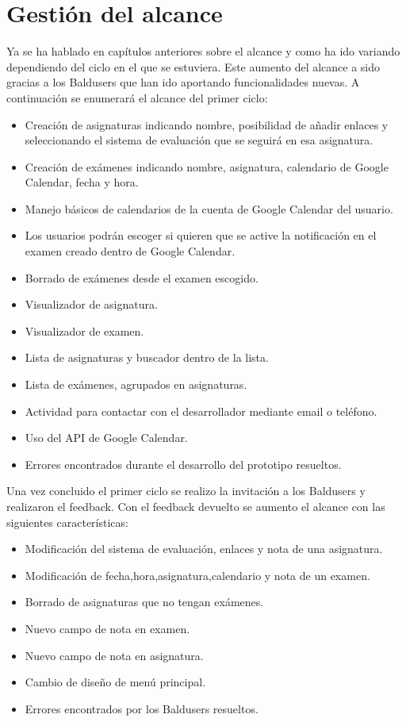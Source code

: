 \section{Gestión del alcance}
\label{secc:Gestión del alcance}

Ya se ha hablado en capítulos anteriores sobre el alcance y como ha ido variando dependiendo del ciclo en el que se estuviera. Este aumento del alcance a sido gracias a los Baldusers que han ido aportando funcionalidades nuevas.
A continuación se enumerará el alcance del primer ciclo:
\begin{itemize}
	\item Creación de asignaturas indicando nombre, posibilidad de añadir enlaces y seleccionando el sistema de evaluación que se seguirá en esa asignatura. 
	\item Creación de exámenes indicando nombre, asignatura, calendario de Google Calendar, fecha y hora.
	\item Manejo básicos de calendarios de la cuenta de Google Calendar del usuario. 
	\item Los usuarios podrán escoger si quieren que se active la notificación en el examen creado dentro de Google Calendar.
	\item Borrado de exámenes desde el examen escogido.
	\item Visualizador de asignatura.
	\item Visualizador de examen.
	\item Lista de asignaturas y buscador dentro de la lista.
	\item Lista de exámenes, agrupados en asignaturas.
	\item Actividad para contactar con el desarrollador mediante email o teléfono.
	\item Uso del API de Google Calendar.
	\item Errores encontrados durante el desarrollo del prototipo resueltos.
\end{itemize}
\newpage
Una vez concluido el primer ciclo se realizo la invitación a los Baldusers y realizaron el feedback. Con el feedback devuelto se aumento el alcance con las siguientes características:
\begin{itemize}
	\item Modificación del sistema de evaluación, enlaces y nota de una asignatura.
	\item Modificación de fecha,hora,asignatura,calendario y nota de un examen.
	\item Borrado de asignaturas que no tengan exámenes.
	\item Nuevo campo de nota en examen.
	\item Nuevo campo de nota en asignatura.
	\item Cambio de diseño de menú principal.
	\item Errores encontrados por los Baldusers resueltos.
\end{itemize}
